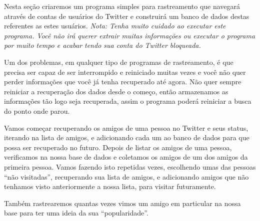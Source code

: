 Nesta seção criaremos um programa simples para rastreamento que navegará
através de contas de usuários do Twitter e construirá um banco de dados
destas referentes as estes usuários.
\emph{Nota: Tenha muito cuidado ao executar este programa. Você não irá querer
  extrair muitas informações ou executar o programa por muito tempo e acabar
  tendo sua conta do Twitter bloqueada.}


Um dos problemas, em qualquer tipo de programas de rastreamento, é que precisa
ser capaz de ser interrompido e reiniciado muitas vezes e você não quer perder
informações que você já tenha recuperado até agora. Não quer sempre reiniciar
a recuperação dos dados desde o começo, então armazenamos as informações tão
logo seja recuperada, assim o programa poderá reiniciar a busca do ponto onde
parou.



Vamos começar recuperando os amigos de uma pessoa no Twitter e seus status,
iterando na lista de amigos, e adicionando cada um ao banco de dados para
que possa ser recuperado no futuro. Depois de listar os amigos de uma pessoa,
verificamos na nossa base de dados e coletamos os amigos de um dos amigos da
primeira pessoa. Vamos fazendo isto repetidas vezes, escolhendo umas das
pessoas ``não visitadas'', recuperando sua lista de amigos, e
adicionando amigos que não tenhamos visto anteriormente a nossa lista, para
visitar futuramente.


Também rastrearemos quantas vezes vimos um amigo em particular na nossa base
para ter uma ideia da sua ``popularidade''.

